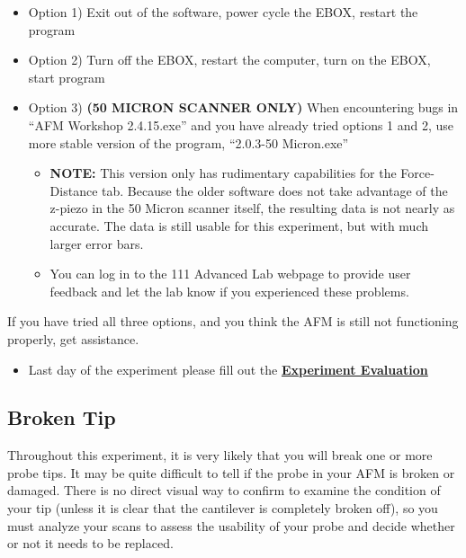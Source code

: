 \documentclass{../lab}
\begin{document}
\begin{itemize}
    \item Option 1) Exit out of the software, power cycle the EBOX, restart the program

    \item Option 2) Turn off the EBOX, restart the computer, turn on the EBOX, start program

    \item Option 3) \textbf{(50 MICRON SCANNER ONLY)} When encountering bugs in ``AFM Workshop 2.4.15.exe'' and you have already tried options 1 and 2, use more stable version of the program, ``2.0.3-50 Micron.exe''
    \begin{itemize}
        \item \textbf{NOTE:} This version only has rudimentary capabilities for the Force-Distance tab.  Because the older software does not take advantage of the z-piezo in the 50 Micron scanner itself, the resulting data is not nearly as accurate.  The data is still usable for this experiment, but with much larger error bars.

        \item You can log in to the 111 Advanced Lab webpage to provide user feedback and let the lab know if you experienced these problems.

    \end{itemize}

\end{itemize}

If you have tried all three options, and you think the AFM is still not functioning properly, get assistance.

\begin{itemize}
    \item Last day of the experiment please fill out the \href{\ExperimentEvaluation}{\textbf{Experiment Evaluation}}

\end{itemize}

\subsection{Broken Tip}
\label{subsec:BrokenTip}

Throughout this experiment, it is very likely that you will break one or more probe tips.  It may be quite difficult to tell if the probe in your AFM is broken or damaged.  There is no direct visual way to confirm to examine the condition of your tip (unless it is clear that the cantilever is completely broken off), so you must analyze your scans to assess the usability of your probe and decide whether or not it needs to be replaced.
\end{document}
